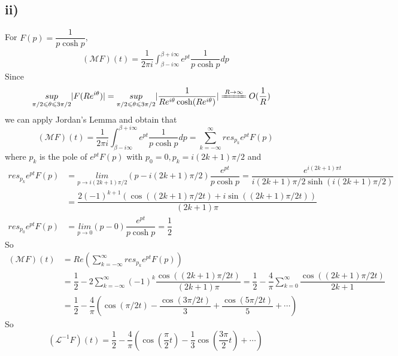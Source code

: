 \documentclass[a4paper,12pt,titlepage]{article}
\begin{document}
\subsection*{ii)}
For $F(p)=\dfrac{1}{p\cosh p}$, 
\begin{align*}
(\mathcal{M}F)(t)=\dfrac{1}{2\pi i}\int_{\beta-i\infty}^{\beta+i\infty}e^{pt}\dfrac{1}{p\cosh p}dp
\end{align*}
Since
\begin{align*}
\underset{\pi/2\leqslant\theta\leqslant3\pi/2}{sup}|F(Re^{i\theta})|&=\underset{\pi/2\leqslant\theta\leqslant3\pi/2}{sup}|\dfrac{1}{Re^{i\theta}\cosh (Re^{i\theta})}|\xlongequal{R\rightarrow\infty} O(\dfrac{1}{R})
\end{align*}
we can apply Jordan's Lemma and obtain that
$$(\mathcal{M}F)(t)=\dfrac{1}{2\pi i}\int_{\beta-i\infty}^{\beta+i\infty}e^{pt}\dfrac{1}{p\cosh p}dp=\sum\limits_{k=-\infty}^{\infty}res_{p_k}e^{pt}F(p)$$
where $p_k$ is the pole of $e^{pt}F(p)$ with $p_0=0,p_k=i(2k+1)\pi/2$ and 
\begin{align*}
res_{p_k}e^{pt}F(p)&=\underset{p\rightarrow i(2k+1)\pi/2}{lim}(p-i(2k+1)\pi/2)\dfrac{e^{pt}}{p\cosh p}=\dfrac{e^{i(2k+1)\pi t}}{i(2k+1)\pi/2\sinh (i(2k+1)\pi/2)}\\
&=\dfrac{2(-1)^{k+1}(\cos((2k+1)\pi/2 t)+i\sin((2k+1)\pi/2 t))}{(2k+1)\pi}\\
res_{p_0}e^{pt}F(p)&=\underset{p\rightarrow 0}{lim}(p-0)\dfrac{e^{pt}}{p\cosh p}=\dfrac{1}{2}
\end{align*}
So
\begin{align*}
(\mathcal{M}F)(t)&=Re(\sum\limits_{k=-\infty}^{\infty}res_{p_k}e^{pt}F(p))\\
&=\dfrac{1}{2}-2\sum\limits_{k=-\infty}^{\infty}(-1)^{k}\dfrac{\cos((2k+1)\pi/2 t)}{(2k+1)\pi}=\dfrac{1}{2}-\dfrac{4}{\pi}\sum\limits_{k=0}^{\infty}\dfrac{\cos((2k+1)\pi/2 t)}{2k+1}\\
&=\dfrac{1}{2}-\dfrac{4}{\pi}(\cos(\pi/2 t)-\dfrac{\cos(3\pi/2 t)}{3}+\dfrac{\cos(5\pi/2 t)}{5}+\cdots)
\end{align*}
So
$$(\mathcal{L}^{-1}F)(t)=\dfrac{1}{2}-\dfrac{4}{\pi}(\cos(\dfrac{\pi}{2} t)-\dfrac{1}{3}\cos(\dfrac{3\pi}{2} t)+\cdots)$$
\end{document}
